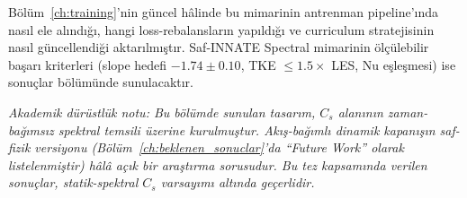 Bölüm~\ref{ch:training}'nin güncel hâlinde bu mimarinin
antrenman pipeline'ında nasıl ele alındığı, hangi loss-rebalansların
yapıldığı ve curriculum stratejisinin nasıl güncellendiği aktarılmıştır.
Saf-INNATE Spectral mimarinin ölçülebilir başarı kriterleri (slope
hedefi $-1.74\pm 0.10$, TKE $\leq 1.5\times$ LES, Nu eşleşmesi) ise
sonuçlar bölümünde sunulacaktır.

\bigskip

\noindent\textit{Akademik dürüstlük notu: Bu bölümde sunulan tasarım,
$C_s$ alanının zaman-bağımsız spektral temsili üzerine kurulmuştur.
Akış-bağımlı dinamik kapanışın saf-fizik versiyonu (Bölüm~\ref{ch:beklenen_sonuclar}'da
``Future Work'' olarak listelenmiştir) hâlâ açık bir araştırma
sorusudur. Bu tez kapsamında verilen sonuçlar, statik-spektral
$C_s$ varsayımı altında geçerlidir.}
